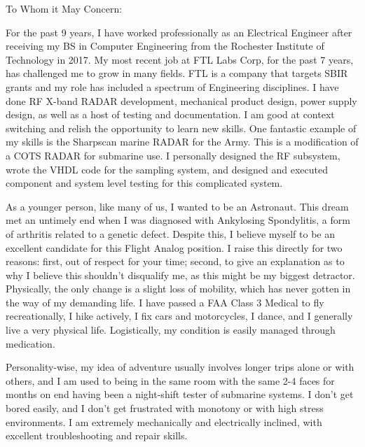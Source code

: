 \documentclass[line]{res}
\begin{document}
\address{51 Irene St.}
\address{Chicopee MA 01013}
\website{}
 
\begin{resume}
 \setlength\multicolsep{2pt}


 
\vspace{1in}
To Whom it May Concern:

For the past 9 years, I have worked professionally as an Electrical Engineer after 
receiving my BS in Computer Engineering from the Rochester Institute of Technology in 2017.
My most recent job at FTL Labs Corp, for the past 7 years, has challenged me to
grow in many fields. FTL is a company that targets SBIR grants and my role has 
included a spectrum of Engineering disciplines. I have done RF X-band RADAR development, 
mechanical product design, power supply design, as well as a host of testing and 
documentation. I am good at context switching and relish the opportunity to learn new skills.
One fantastic example of my skills is the Sharpscan marine RADAR for the Army. This is 
a modification of a COTS RADAR for submarine use. I personally designed the RF 
subsystem, wrote the VHDL code for the sampling system, and designed and executed 
component and system level testing for this complicated system.


As a younger person, like many of us, I wanted to be an Astronaut. This dream
met an untimely end when I was diagnosed with Ankylosing Spondylitis, a form of 
arthritis related to a genetic defect. Despite this, I believe myself to be an excellent 
candidate for this Flight Analog position. I raise this directly for two reasons: 
first, out of respect for your time; second, to give an explanation as to
why I believe this shouldn't disqualify me, as this might be my biggest detractor.
Physically, the only change is a slight loss of mobility, which has never gotten 
in the way of my demanding life. I have passed a FAA Class 3 Medical to fly 
recreationally, I hike actively, I fix cars and motorcycles, I dance, and I generally 
live a very physical life. Logistically, my condition is easily managed through medication. 


Personality-wise, my idea of adventure usually involves longer trips alone or with others,
and I am used to being in the same room with the same 2-4 faces for months on end
having been a night-shift tester of submarine systems. I don't get bored easily,
and I don't get frustrated with monotony or with high stress environments. I am
extremely mechanically and electrically inclined, with excellent troubleshooting
and repair skills.



\end{resume}
\end{document}
